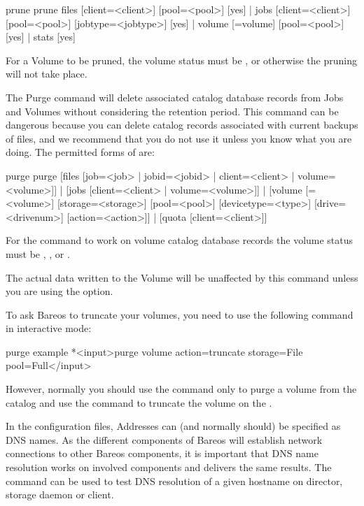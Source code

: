 \begin{description}
\begin{bconsole}{prune}
prune files [client=<client>] [pool=<pool>] [yes] |
      jobs [client=<client>] [pool=<pool>] [jobtype=<jobtype>] [yes] |
      volume [=volume] [pool=<pool>] [yes] |
      stats [yes]
\end{bconsole}

   For a Volume to be pruned, the volume status must be ,  or
    otherwise the pruning will not take place.

\item [purge]
   \label{bcommandPurge}
   The Purge command will delete associated catalog database records from
   Jobs and Volumes without considering the retention period.
   This command can be dangerous because you can delete catalog
   records associated with current backups of files, and we recommend that
   you do not use it unless you know what you are doing.  The permitted
   forms of  are:

\begin{bconsole}{purge}
purge [files [job=<job> | jobid=<jobid> | client=<client> | volume=<volume>]] |
      [jobs [client=<client> | volume=<volume>]] |
      [volume [=<volume>] [storage=<storage>] [pool=<pool>] [devicetype=<type>] [drive=<drivenum>] [action=<action>]] |
      [quota [client=<client>]]
\end{bconsole}

For the  command to work on volume catalog database  records the
volume status must be , ,  or .

The actual data written to the Volume will be unaffected by this command unless
you are using the  option.

To ask Bareos to truncate your  volumes, you need to use the
following command in interactive mode:
\begin{bconsole}{purge example}
*<input>purge volume action=truncate storage=File pool=Full</input>
\end{bconsole}

However, normally you should use the  command only to purge a volume from the catalog
and use the  command to truncate the volume on the \bareosSd.

\item [resolve]
    In the configuration files, Addresses can (and normally should) be specified as DNS names.
    As the different components of Bareos will establish network connections to other Bareos components,
    it is important that DNS name resolution works on involved components and delivers the same results.
    The  command can be used to test DNS resolution of a given hostname 
    on director, storage daemon or client.


\end{description}
